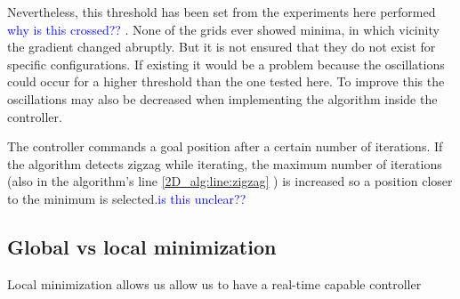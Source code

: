 Nevertheless, this threshold has been set from the experiments here performed \textcolor{blue}{why is this crossed?? }. None of the grids ever showed minima, in which vicinity the gradient changed abruptly. But it is not ensured that they do not exist for specific configurations. If existing it would be a problem because the oscillations could occur for a higher threshold than the one tested here. To improve this the oscillations may also be decreased when implementing the algorithm inside the
controller. 

The controller commands a goal position after a certain number of iterations. If the algorithm detects zigzag while iterating, the maximum number of iterations (also in the algorithm's line \ref{2D_alg:line:zigzag} ) is increased so a position closer to the minimum is selected.\textcolor{blue}{is this unclear?? }










 
 \subsection{Global vs local minimization}
 \label{subsec:compare_globalvslocal}
 
Local minimization allows us  allow us to have a real-time capable controller









 
